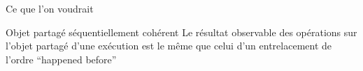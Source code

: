 \begin{frame}[fragile]{Ce que l'on voudrait}
  \pause
  \vspace{-1mm}

  \begin{block}{Objet partagé séquentiellement cohérent}
    Le résultat observable \alert{des opérations sur l'objet partagé}
    d'une exécution est le même que celui d'un entrelacement de l'ordre ``happened before''
  \end{block}

\end{frame}

\endgroup
\endinput
